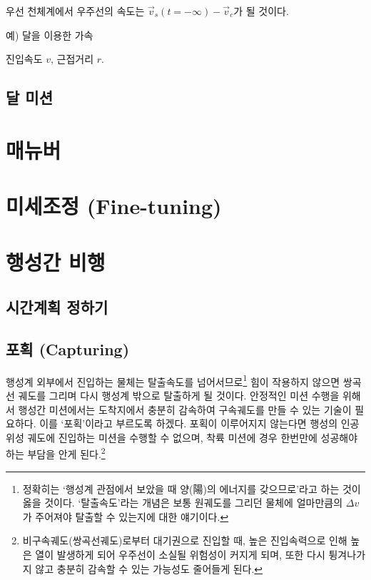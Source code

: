 \documentclass[9pt]{amsbook}
\begin{document}
우선 천체계에서 우주선의 속도는 $\vec{v}_s(t=-\infty)-\vec{v}_c$가 될 것이다.

예) 달을 이용한 가속

진입속도 $v$, 근접거리 $r$.

\chapter{달 미션}

\part{매뉴버}
\part{미세조정 (Fine-tuning)}
\part{행성간 비행}
\chapter{시간계획 정하기}
\chapter{포획 (Capturing)}
행성계 외부에서 진입하는 물체는 탈출속도를 넘어서므로\footnote{정확히는 `행성계 관점에서 보았을 때 양(陽)의 에너지를 갖으므로'라고 하는 것이 옳을 것이다. `탈출속도'라는 개념은 보통 원궤도를 그리던 물체에 얼마만큼의 $\Delta v$가 주어져야 탈출할 수 있는지에 대한 얘기이다.} 힘이 작용하지 않으면 쌍곡선 궤도를 그리며 다시 행성계 밖으로 탈출하게 될 것이다.
안정적인 미션 수행을 위해서 행성간 미션에서는 도착지에서 충분히 감속하여 구속궤도를 만들 수 있는 기술이 필요하다. 이를 `포획'이라고 부르도록 하겠다. 포획이 이루어지지 않는다면 행성의 인공위성 궤도에 진입하는 미션을 수행할 수 없으며, 착륙 미션에 경우 한번만에 성공해야 하는 부담을 안게 된다.\footnote{비구속궤도(쌍곡선궤도)로부터 대기권으로 진입할 때, 높은 진입속력으로 인해 높은 열이 발생하게 되어 우주선이 소실될 위험성이 커지게 되며, 또한 다시 튕겨나가지 않고 충분히 감속할 수 있는 가능성도 줄어들게 된다.}
\end{document}
